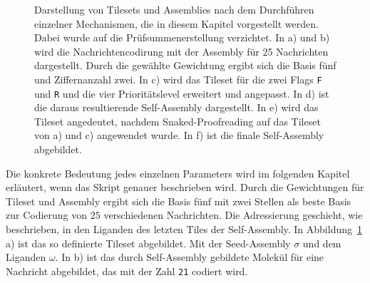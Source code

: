 \begin{figure}
\begin{subfigure}{\textwidth}
    \end{subfigure}
    \caption[Konzept Zusammenfassung Beispiel Molekül]{Darstellung von Tilesets und Assemblies nach dem Durchführen einzelner Mechanismen, die in diesem Kapitel vorgestellt werden. Dabei wurde auf die Prüfsummenerstellung verzichtet. In a) und b) wird die Nachrichtencodirung mit der Assembly für 25 Nachrichten dargestellt. Durch die gewählte Gewichtung ergibt sich die Basis fünf und Ziffernanzahl zwei. In c) wird das Tileset für die zwei Flags \texttt{F} und \texttt{R} und die vier Prioritätslevel erweitert und angepasst. In d) ist die daraus resultierende Self-Assembly dargestellt. In e) wird das Tileset angedeutet, nachdem Snaked-Proofreading auf das Tileset von a) und c) angewendet wurde. In f) ist die finale Self-Assembly abgebildet.}
    \label{fig:konzept_bsp_mol} 
\end{figure}

Die konkrete Bedeutung jedes einzelnen Parameters wird im folgenden Kapitel erläutert, wenn das Skript genauer beschrieben wird. Durch die Gewichtungen für Tileset und Assembly ergibt sich die Basis fünf mit zwei Stellen als beste Basis zur Codierung von $25$ verschiedenen Nachrichten. Die Adressierung geschieht, wie beschrieben, in den Liganden des letzten Tiles der Self-Assembly. In Abbildung~\ref{fig:konzept_bsp_mol} a) ist das so definierte Tileset abgebildet. Mit der Seed-Assembly $\sigma$ und dem Liganden $\omega$. In b) ist das durch Self-Assembly gebildete Molekül für eine Nachricht abgebildet, das mit der Zahl \texttt{21} codiert wird. 

